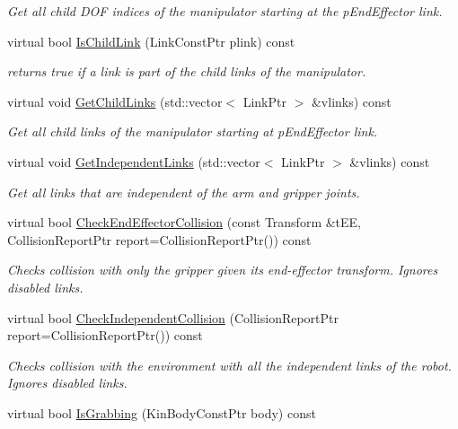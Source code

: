 \begin{DoxyCompactItemize}
\begin{DoxyCompactList}\small\item\em Get all child DOF indices of the manipulator starting at the pEndEffector link. \item\end{DoxyCompactList}\item 
virtual bool \hyperlink{classOpenRAVE_1_1RobotBase_1_1Manipulator_a63a72836eeef2579aff6424767e91007}{IsChildLink} (LinkConstPtr plink) const 
\begin{DoxyCompactList}\small\item\em returns true if a link is part of the child links of the manipulator. \item\end{DoxyCompactList}\item 
virtual void \hyperlink{classOpenRAVE_1_1RobotBase_1_1Manipulator_a235e6b3b9b27422cdf11846a71f5ca66}{GetChildLinks} (std::vector$<$ LinkPtr $>$ \&vlinks) const 
\begin{DoxyCompactList}\small\item\em Get all child links of the manipulator starting at pEndEffector link. \item\end{DoxyCompactList}\item 
virtual void \hyperlink{classOpenRAVE_1_1RobotBase_1_1Manipulator_a9891f6fc2999ae047ebc9d06c0bf4069}{GetIndependentLinks} (std::vector$<$ LinkPtr $>$ \&vlinks) const 
\begin{DoxyCompactList}\small\item\em Get all links that are independent of the arm and gripper joints. \item\end{DoxyCompactList}\item 
virtual bool \hyperlink{classOpenRAVE_1_1RobotBase_1_1Manipulator_a409973001a95f36e715c2f227fd28c5a}{CheckEndEffectorCollision} (const Transform \&tEE, CollisionReportPtr report=CollisionReportPtr()) const 
\begin{DoxyCompactList}\small\item\em Checks collision with only the gripper given its end-\/effector transform. Ignores disabled links. \item\end{DoxyCompactList}\item 
virtual bool \hyperlink{classOpenRAVE_1_1RobotBase_1_1Manipulator_a03b7a7ec9520a1302bbfd13ac2e2e225}{CheckIndependentCollision} (CollisionReportPtr report=CollisionReportPtr()) const 
\begin{DoxyCompactList}\small\item\em Checks collision with the environment with all the independent links of the robot. Ignores disabled links. \item\end{DoxyCompactList}\item 
\hypertarget{classOpenRAVE_1_1RobotBase_1_1Manipulator_a27b105dc167c45d59ff59d5f6198c431}{
virtual bool \hyperlink{classOpenRAVE_1_1RobotBase_1_1Manipulator_a27b105dc167c45d59ff59d5f6198c431}{IsGrabbing} (KinBodyConstPtr body) const }
\label{classOpenRAVE_1_1RobotBase_1_1Manipulator_a27b105dc167c45d59ff59d5f6198c431}


\end{DoxyCompactItemize}

